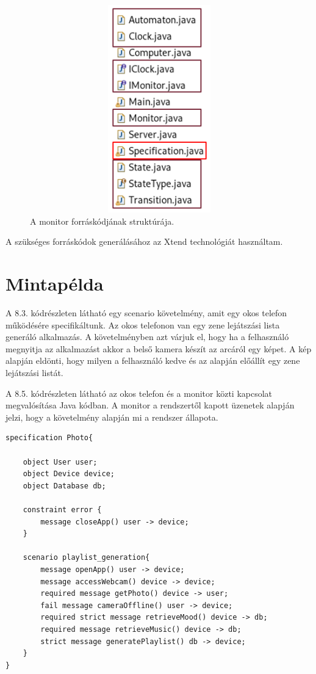 \begin{figure}[!ht]
    \centering
    \includegraphics[width=150mm, height= 9cm, keepaspectratio]{figures/monitor_structure.png}
    \caption{A monitor forráskódjának struktúrája.}
\end{figure}

A szükséges forráskódok generálásához az Xtend technológiát használtam.

\clearpage\section{Mintapélda}

A 8.3. kódrészleten látható egy scenario követelmény, amit egy okos telefon működésére specifikáltunk.
Az okos telefonon van egy zene lejátszási lista generáló alkalmazás.
A követelményben azt várjuk el, hogy ha a felhasználó megnyitja az alkalmazást akkor a belső kamera készít az arcáról egy képet.
A kép alapján eldönti, hogy milyen a felhasználó kedve és az alapján előállít egy zene lejátszási listát.

A 8.5. kódrészleten látható az okos telefon és a monitor közti kapcsolat megvalósítása Java kódban.
A monitor a rendszertől kapott üzenetek alapján jelzi, hogy a követelmény alapján mi a rendszer állapota.

\begin{lstlisting}[frame=single, float=ht!, caption={Okos telefon működésére megadott scenario követelmény.},captionpos=b]
specification Photo{

	object User user;
	object Device device;
	object Database db;

	constraint error {
		message closeApp() user -> device;
	}

	scenario playlist_generation{
		message openApp() user -> device;
		message accessWebcam() device -> device;
		required message getPhoto() device -> user;
		fail message cameraOffline() user -> device;
		required strict message retrieveMood() device -> db;
		required message retrieveMusic() device -> db;
		strict message generatePlaylist() db -> device;
	}
}
\end{lstlisting}

